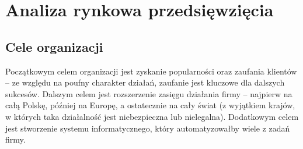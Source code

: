 \documentclass{article}
\begin{document}

\section{Analiza rynkowa przedsięwzięcia}
\subsection{Cele organizacji}
Początkowym celem organizacji jest zyskanie popularności oraz zaufania klientów -- ze względu na poufny charakter działań, zaufanie jest kluczowe dla dalszych sukcesów. Dalszym celem jest rozszerzenie zasięgu działania firmy -- najpierw na całą Polskę, później na Europę, a ostatecznie na cały świat (z wyjątkiem krajów, w których taka działalność jest niebezpieczna lub nielegalna). Dodatkowym celem jest stworzenie systemu informatycznego, który automatyzowałby wiele z zadań firmy.
\end{document}
